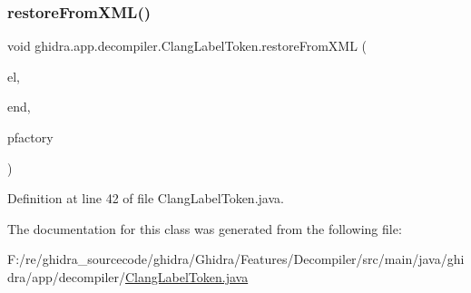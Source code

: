 \subsubsection{\texorpdfstring{restoreFromXML()}{restoreFromXML()}}
{\footnotesize\ttfamily void ghidra.\+app.\+decompiler.\+Clang\+Label\+Token.\+restore\+From\+X\+ML (\begin{DoxyParamCaption}\item[{Xml\+Element}]{el,  }\item[{Xml\+Element}]{end,  }\item[{Pcode\+Factory}]{pfactory }\end{DoxyParamCaption})\hspace{0.3cm}{\ttfamily [inline]}}



Definition at line 42 of file Clang\+Label\+Token.\+java.



The documentation for this class was generated from the following file\+:\begin{DoxyCompactItemize}
\item 
F\+:/re/ghidra\+\_\+sourcecode/ghidra/\+Ghidra/\+Features/\+Decompiler/src/main/java/ghidra/app/decompiler/\mbox{\hyperlink{_clang_label_token_8java}{Clang\+Label\+Token.\+java}}\end{DoxyCompactItemize}
